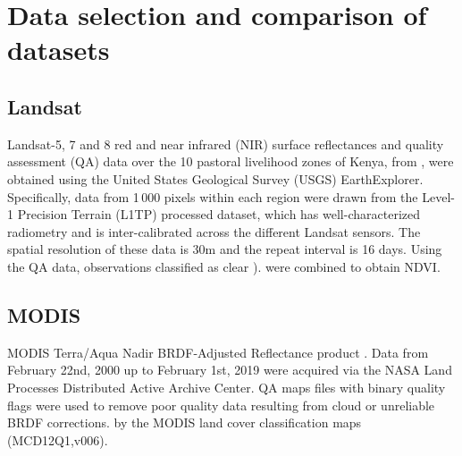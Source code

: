 \documentclass[review]{elsarticle}
\begin{document}
\section{Data selection and comparison of datasets} \label{sec:datasets}

\subsection{Landsat}
Landsat-5, 7 and 8 \citep{royetal} red and near infrared (NIR) surface reflectances and quality assessment (QA) data over the 10 pastoral livelihood zones of Kenya, from , were obtained using the United States Geological Survey (USGS) EarthExplorer. Specifically, data from 1\,000 pixels within each region were drawn from the Level-1 Precision Terrain (L1TP) processed dataset, which has well-characterized radiometry and is inter-calibrated across the different Landsat sensors. The spatial resolution of these data is 30m and the repeat interval is 16 days. Using the QA data, observations classified as clear  ). %
 were combined to obtain 
NDVI. %

\subsection{MODIS}

 MODIS Terra/Aqua Nadir BRDF-Adjusted Reflectance product \citep[MCD43A4,v006;][]{Schaaf2015}. Data from February 22nd, 2000 up to February 1st, 2019 were acquired via the NASA Land Processes Distributed Active Archive Center. QA maps files with binary quality flags were used to remove poor quality data resulting from cloud or unreliable BRDF corrections.  by the MODIS land cover classification maps (MCD12Q1,v006). 
\end{document}

